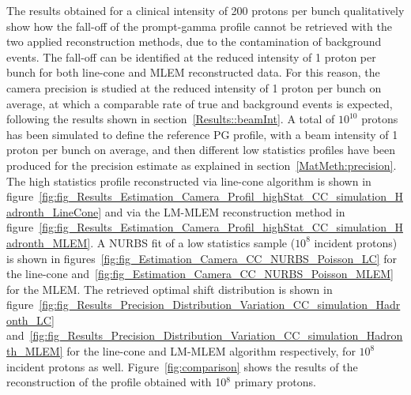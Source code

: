 The results obtained for a clinical intensity of 200 protons per bunch qualitatively show how the fall-off of the prompt-gamma profile cannot be retrieved with the two applied reconstruction methods, due to the contamination of background events. The fall-off can be identified at the reduced intensity of 1 proton per bunch for both line-cone and MLEM reconstructed data.
For this reason, the camera precision is studied at the reduced intensity of 1 proton per bunch on average, at which a comparable rate of true and background events is expected, following the results shown in section~\ref{Results::beamInt}.
A total of $10^{10}$ protons has been simulated to define the reference PG profile, with a beam intensity of 1 proton per bunch on average, and then different low statistics profiles have been produced for the precision estimate as explained in section~\ref{MatMeth:precision}. 
The high statistics profile reconstructed via line-cone algorithm is shown in figure~\ref{fig:fig_Results_Estimation_Camera_Profil_highStat_CC_simulation_Hadronth_LineCone} and via the LM-MLEM reconstruction method in figure~\ref{fig:fig_Results_Estimation_Camera_Profil_highStat_CC_simulation_Hadronth_MLEM}. A NURBS fit of a low statistics sample ($10^8$ incident protons) is shown in figures~\ref{fig:fig_Estimation_Camera_CC_NURBS_Poisson_LC} for the line-cone and~\ref{fig:fig_Estimation_Camera_CC_NURBS_Poisson_MLEM} for the MLEM.
The retrieved optimal shift distribution is shown in figure~\ref{fig:fig_Results_Precision_Distribution_Variation_CC_simulation_Hadronth_LC} and~\ref{fig:fig_Results_Precision_Distribution_Variation_CC_simulation_Hadronth_MLEM} for the line-cone and LM-MLEM algorithm respectively, for $10^8$ incident protons as well.
Figure~\ref{fig:comparison} shows the results of the reconstruction of the profile obtained with 10$^8$ primary protons.


